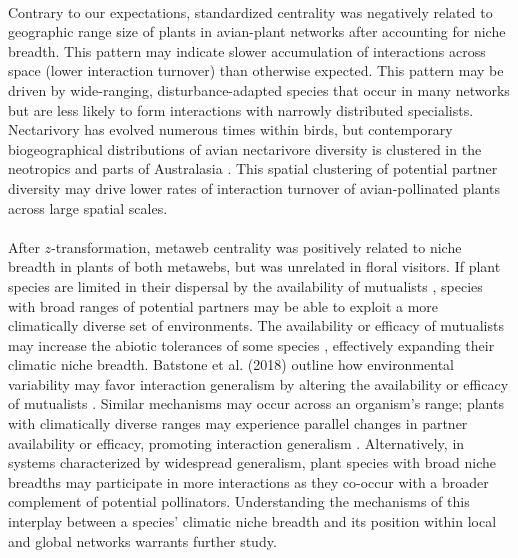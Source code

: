 \documentclass[12pt]{article}
\begin{document}
\paragraph*{}
Contrary to our expectations, standardized centrality was negatively related to geographic range size of plants in avian-plant networks after accounting for niche breadth. This pattern may indicate slower accumulation of interactions across space (lower interaction turnover) than otherwise expected. This pattern may be driven by wide-ranging, disturbance-adapted species that occur in many networks but are less likely to form interactions with narrowly distributed specialists. Nectarivory has evolved numerous times within birds, but contemporary biogeographical distributions of avian nectarivore diversity is clustered in the neotropics and parts of Australasia \citep{kissling2012bird}. This spatial clustering of potential partner diversity may drive lower rates of interaction turnover of avian-pollinated plants across large spatial scales. 

\paragraph*{}
After $z$-transformation, metaweb centrality was positively related to niche breadth in plants of both metawebs, but was unrelated in floral visitors. If plant species are limited in their dispersal by the availability of mutualists \citep{warren2014mutualism, duffy2017specialized}, species with broad ranges of potential partners may be able to exploit a more climatically diverse set of environments. The availability or efficacy of mutualists may increase the abiotic tolerances of some species \citep{warren2014mutualism, fowler2023geographic}, effectively expanding their climatic niche breadth. Batstone et al. (2018) outline how environmental variability may favor interaction generalism by altering the availability or efficacy of mutualists \citep{batstone2018using}. Similar mechanisms may occur across an organism's range; plants with climatically diverse ranges may experience parallel changes in partner availability or efficacy, promoting interaction generalism \citep{hurtado2024generalism}. Alternatively, in systems characterized by widespread generalism, plant species with broad niche breadths may participate in more interactions as they co-occur with a broader complement of potential pollinators. Understanding the mechanisms of this interplay between a species' climatic niche breadth and its position within local and global networks warrants further study. 
\end{document}
